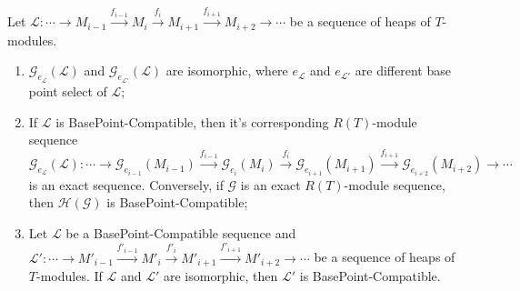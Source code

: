 \documentclass[11pt, twoside]{article}
\begin{document}
\begin{proposition}
Let $ \mathcal{L}: \cdots \to M_{i-1} \xrightarrow{f_{i-1}} M_i \xrightarrow{f_i} M_{i+1} \xrightarrow{f_{i+1}} M_{i+2} \to \cdots$ be a sequence of heaps of $T$-modules.
\begin{enumerate}
    \item[(i)] $\mathcal{G}_{e_\mathcal{L}}(\mathcal{L})$ and $\mathcal{G}_{e_\mathcal{L'}}(\mathcal{L})$ are isomorphic, where $e_\mathcal{L}$ and $e_\mathcal{L'}$ are different base point select of $\mathcal{L}$;
    \item[(ii)] If $\mathcal{L}$ is BasePoint-Compatible, then it's corresponding $R(T)$-module sequence $ \mathcal{G}_{e_\mathcal{L}}(\mathcal{L}): \cdots \to \mathcal{G}_{e_{i-1}}(M_{i-1}) \xrightarrow{f_{i-1}} \mathcal{G}_{e_{i}}(M_{i}) \xrightarrow{f_i} \mathcal{G}_{e_{i+1}}(M_{i+1}) \xrightarrow{f_{i+1}} \mathcal{G}_{e_{i+2}}(M_{i+2}) \to \cdots $ is an exact sequence. Conversely, if $\mathcal{G}$ is an exact $R(T)$-module sequence, then $\mathcal{H(G)}$ is BasePoint-Compatible;
    \item[(iii)] Let $\mathcal{L}$ be a BasePoint-Compatible sequence and $\mathcal{L'}: \cdots \to M'_{i-1} \xrightarrow{f'_{i-1}} M'_i \xrightarrow{f'_i} M'_{i+1} \xrightarrow{f'_{i+1}} M'_{i+2} \to \cdots$ be a sequence of heaps of $T$-modules. If $\mathcal{L}$ and $\mathcal{L'}$ are isomorphic, then $\mathcal{L'}$ is BasePoint-Compatible.
\end{enumerate}
\end{proposition}
\end{document}

